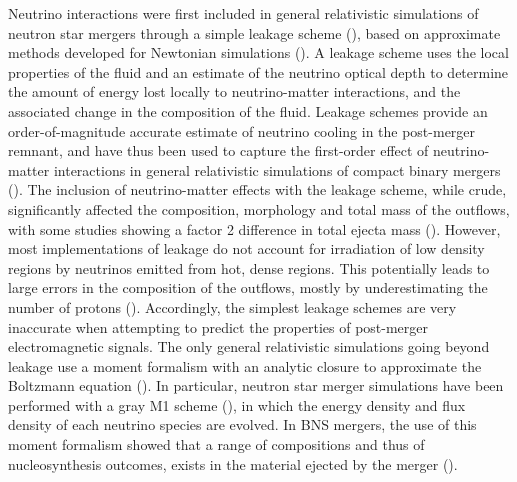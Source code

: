 Neutrino interactions were first included in general relativistic simulations of neutron star mergers through a simple leakage scheme (\cite{sekiguchi:2011zd}), based on approximate methods developed for Newtonian simulations (\cite{ruffert1996,rosswog:2003rv}). A leakage scheme uses the local properties of the fluid and an estimate of the neutrino optical depth to determine the amount of energy lost locally to neutrino-matter interactions, and the associated change in the composition of the fluid. Leakage schemes provide an order-of-magnitude accurate estimate of neutrino cooling in the post-merger remnant, and have thus been used to capture the first-order effect of neutrino-matter interactions in general relativistic simulations of compact binary mergers (\cite{sekiguchi:2011zd,wanajo2014,lehner2016unequal,radice2016dynamical,palenzuela2015,deaton2013black,foucart2014neutron}). The inclusion of neutrino-matter effects with the leakage scheme, while crude, significantly affected the composition, morphology and total mass of the outflows, with some studies showing a factor 2 difference in total ejecta mass (\cite{radice2016dynamical}). However, most implementations of leakage do not account for irradiation of low density regions by neutrinos emitted from hot, dense regions. This potentially leads to large errors in the composition of the outflows, mostly by underestimating the number of protons (\cite{foucartm1:2016,foucart2015post}). Accordingly, the simplest leakage schemes are very inaccurate when attempting to predict the properties of post-merger electromagnetic signals. The only general relativistic simulations going beyond leakage use a moment formalism with an analytic closure to approximate the Boltzmann equation (\cite{1981mnras.194..439t,shibata:11}). In particular, neutron star merger simulations have been performed with a gray M1 scheme (\cite{foucartm1:2016,foucart2015post,sekiguchi2015dynamical,sekiguchi2016dynamical}), in which the energy density and flux density of each neutrino species are evolved. In BNS mergers, the use of this moment formalism showed that a range of compositions and thus of nucleosynthesis outcomes, exists in the material ejected by the merger (\cite{wanajo2014}). 

